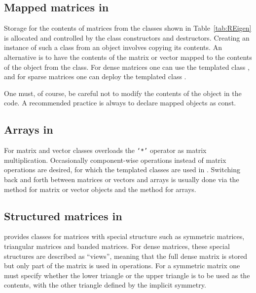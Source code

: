 \documentclass[shortnames,article,nojss]{jss}
\newcommand{\hlkwb}[1]{\textcolor[rgb]{0.13,0.54,0.13}{#1}}
\begin{document}
\subsection[Mapped matrices in Eigen]{Mapped matrices in }
\label{sec:mapped}

Storage for the contents of matrices from the classes shown in
Table~\ref{tab:REigen} is allocated and controlled by the class
constructors and destructors.  Creating an instance of such a class
from an  object involves copying its contents.  An
alternative is to have the contents of the  matrix or
vector mapped to the contents of the object from the  class.  For
dense matrices one can use the  templated class , and for
sparse matrices one can deploy the  templated class .

One must, of course, be careful not to modify the contents of the
 object in the  code.  A recommended
practice is always to declare mapped objects as {\ttfamily\hlkwb{const}\normalfont}.

\subsection[Arrays in Eigen]{Arrays in }
\label{sec:arrays}

For matrix and vector classes  overloads the \texttt{`*'}
operator as matrix multiplication.  Occasionally component-wise
operations instead of matrix operations are desired, for which the
 templated classes are used in .  Switching
back and forth between matrices or vectors and arrays is usually done
via the  method for matrix or vector objects and the
 method for arrays.

\subsection[Structured matrices in Eigen]{Structured matrices in }
\label{sec:structured}

 provides classes for matrices with special structure such
as symmetric matrices, triangular matrices and banded matrices.  For
dense matrices, these special structures are described as ``views'',
meaning that the full dense matrix is stored but only part of the
matrix is used in operations.  For a symmetric matrix one must
specify whether the lower triangle or the upper triangle is to be used as
the contents, with the other triangle defined by the implicit symmetry.
\end{document}
